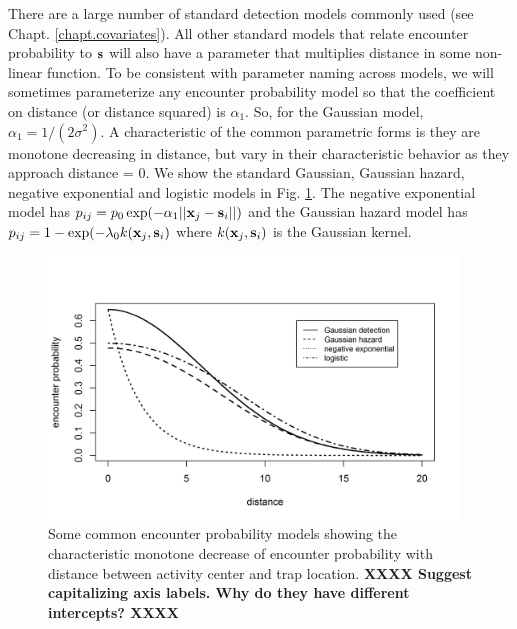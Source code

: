 There are a large number of standard detection models commonly used
(see Chapt. \ref{chapt.covariates}).  All other standard models that
relate encounter probability to ${\bf s}$ will also have a parameter
that multiplies distance in some non-linear function.  To be
consistent with parameter naming across models, we will sometimes
parameterize any encounter probability model so that the coefficient
on distance (or distance squared) is $\alpha_{1}$. So, for the
Gaussian model, $\alpha_{1} = 1/(2\sigma^{2})$.  A characteristic of
the common parametric forms is they are monotone decreasing in
distance, but vary in their characteristic behavior as they approach
distance = 0.  We show the standard Gaussian, Gaussian hazard,
negative exponential and logistic models in
Fig. \ref{scr0.fig.detfuncs}.  The negative exponential model has
$p_{ij} = p_{0}\exp(-\alpha_{1} ||{\bf x}_{j}-{\bf s}_{i}||)$ and the
Gaussian hazard model has $p_{ij} = 1-\exp(-\lambda_{0} k({\bf x}_{j},
{\bf s}_{i})$ where $k({\bf x}_{j}, {\bf s}_{i})$ is the Gaussian
kernel.
\begin{figure}[ht]
\begin{center}
\includegraphics[height=2.75in]{Ch4-SCR0/figs/det_functions}
\end{center}
\caption{Some common encounter probability models showing the
  characteristic monotone decrease of encounter probability with
  distance between activity center and trap location.
{\bf  XXXX Suggest capitalizing axis labels. Why do they have
   different intercepts? XXXX }
}
\label{scr0.fig.detfuncs}
\end{figure}
